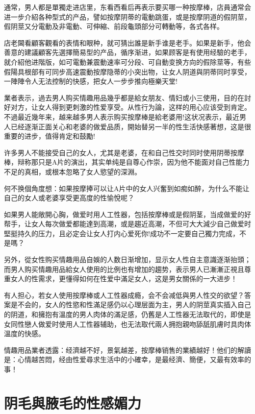 \documentclass[12pt,UTF8]{ctexbook}
\begin{document}
通常，男人都是單獨走进店里，东看西看后再表示要买哪一种按摩棒，店員通常会进一步介紹各种型式的产品，譬如按摩阴蒂的電動跳蛋，或是按摩阴道的假阴莖，假阴莖又分電動及非電動、可伸縮、前段龜頭部分可轉動等，各式各样。

店老閪看顧客觀看的表情和眼种，就可猜出誰是新手谁是老手。如果是新手，他会善意的建議顧客先選擇簡易型的产品，循序渐进，如果顾客是有使用经驗的老手，就介紹他进階版，如可電動兼震動速率可分段、可自動变换方向的假除莖等，有些假陽具根部有可同步高速震動按摩隐蒂的小突出物，让女人阴道與阴蒂同时享受，一陣陣令人无法控制的快感，把女人一步步推向極樂天堂!

業者表示，過去男人购买情趣用品幾乎都是給女朋友、情妇或小三使用，目的在討好对方，让女人得到更刺激的性爱享受。从性行为論，这样的用心应该受到肯定。不過最近幾年来，越来越多男人表示购买按摩棒是給老婆用!这状况表示，最近男人已经逐渐正面关心和老婆的做爱品质，開始替另一半的性生活快感著想，这是很重要的进步，值得肯定和鼓勵!

许多男人不能接受自己的女人，尤其是老婆，在和自己性交时同时使用阴蒂按摩棒，辩称那只是A片的演出，其实单纯是自尊心作崇，因为他不能面对自己性能力不足的真相，或根本忽略了女人慾望的深淵。

何不换個角度想：如果按摩捧可以让A片中的女人兴奮到如痴如醉，为什么不能让自己的女人或老婆享受更高度的性愉悅呢？

如果男人能敞開心胸，做爱时用人工性器，包括按摩棒或是假阴茎，当成做爱的好帮手，让女人每次做爱都能達到高潮，或是趨近高潮，不但可大大減少自己做爱时堅挺持久的压力，且必定会让女人打内心爱死你!成功不一定要自己獨力完成，不是嗎？

另外，從女性购买情趣用品自娛的人数日渐增加，显示女人性自主意識逐渐抬頭；而男人购买情趣用品給女人使用的比例也有增加的趨势，表示男人已漸漸正視且尊重女人的性需求，更懂得如何在性爱中滿足女人，这是男女關係的一大进步！

有人担心，若女人使用按摩棒或人工性器成瘾，会不会减低與男人性交的欲望？答案是不会的，女人的性慾和性滿足感仍以心理层面为主，男人的阴莖真实插入自己的阴道，和擁抱有溫度的男人肉体的滿足感，仍舊是人工性器无法取代的，即使是女同性戀人做爱时使用人工性器辅助，也无法取代兩人拥抱親吻舔舐肌膚时具肉体溫度的快感。

情趣用品業者透露：经濟越不好，景氣越差，按摩棒销售的業績越好！他们的解讀是：心情越苦悶，经由性爱尋求生活中的小確幸，是最经濟、簡便，又最有效率的事！

\chapter{阴毛與腋毛的性感媚力}
\end{document}
